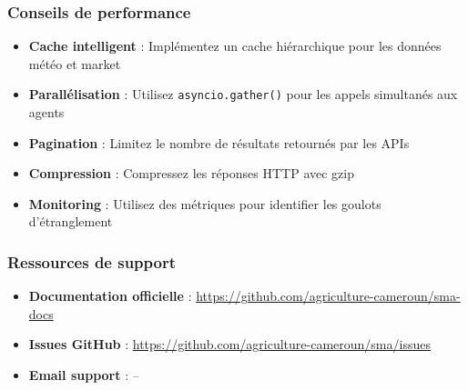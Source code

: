 \subsubsection{Conseils de performance}

\begin{itemize}
    \item \textbf{Cache intelligent} : Implémentez un cache hiérarchique pour les données météo et market
    \item \textbf{Parallélisation} : Utilisez \texttt{asyncio.gather()} pour les appels simultanés aux agents
    \item \textbf{Pagination} : Limitez le nombre de résultats retournés par les APIs
    \item \textbf{Compression} : Compressez les réponses HTTP avec gzip
    \item \textbf{Monitoring} : Utilisez des métriques pour identifier les goulots d'étranglement
\end{itemize}

\subsubsection{Ressources de support}

\begin{itemize}
    \item \textbf{Documentation officielle} : \url{https://github.com/agriculture-cameroun/sma-docs}
    \item \textbf{Issues GitHub} : \url{https://github.com/agriculture-cameroun/sma/issues}
    \item \textbf{Email support} : --
\end{itemize}

